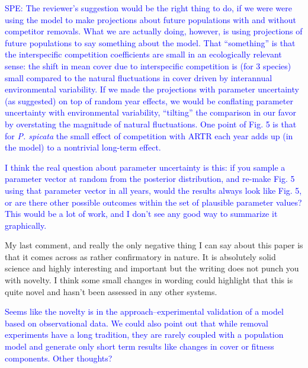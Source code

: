 \documentclass[12pt]{article}
\newcommand{\response}{\textcolor{blue}}
\begin{document}
{\response{SPE: The reviewer's suggestion would be the right thing to do, if we were were using the model to make projections about future populations with and without competitor removals. What we are
actually doing, however, is using projections of future populations to say something about the model. That ``something'' is that the interspecific competition coefficients are small in an ecologically
relevant sense: the shift in mean cover due to interspecific competition is (for 3 species) small compared to the natural fluctuations in cover driven by interannual environmental variability. 
If we made the projections with parameter uncertainty (as suggested) on top of random year effects, we would be conflating parameter uncertainty with environmental variability, ``tilting'' the
comparison in our favor by overstating the magnitude of natural fluctuations. One point of Fig. 5 is that for \emph{P. spicata} the small effect of competition with ARTR each year adds up (in the model)
to a nontrivial long-term effect.}

\response{I think the real question about parameter uncertainty is this: if you sample a parameter vector at random from the posterior distribution, and re-make Fig. 5 using that parameter vector
in all years, would the results always look like Fig. 5, or are there other possible outcomes within the set of plausible parameter values? This would be a lot of work, and I don't see any good way to
summarize it graphically. } 
 
My last comment, and really the only negative thing I can say about this paper is that it comes across as rather confirmatory in nature. It is absolutely solid science and highly interesting and important but the writing does not punch you with novelty. I think some small changes in wording could highlight that this is quite novel and hasn't been assessed in any other systems. 

\response{Seems like the novelty is in the approach--experimental validation of a model based on observational data. We could also point out that while 
removal experiments have a long tradition, they are rarely coupled with a population model and generate only short term results like changes in cover or 
fitness components. Other thoughts?}

}
\end{document}
